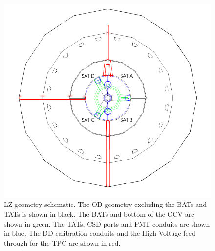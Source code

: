 \begin{figure}[]
\includegraphics[width=\textwidth]{Figures/Geometry/geometry_with_conduits.png}
\centering
\caption{LZ geometry schematic. The OD geometry excluding the BATs and TATs is shown in black. The BATs and bottom of the OCV are shown in green. The TATs, CSD ports and PMT conduits are shown in blue. The DD calibration conduits and the High-Voltage feed through for the TPC are shown in red.}
\label{fig:OD_conduit_geometry}
\end{figure}





